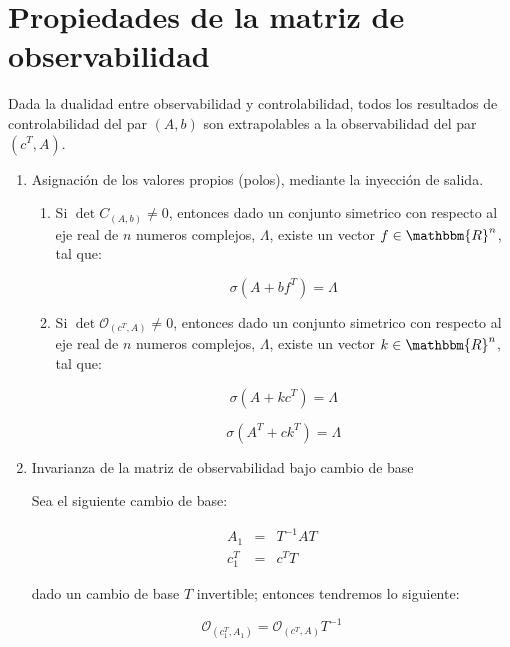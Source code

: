     \newpage
    \section{Propiedades de la matriz de observabilidad}

		Dada la dualidad entre observabilidad y controlabilidad, todos los resultados de controlabilidad del par $(A, b)$ son extrapolables a la observabilidad del par $(c^T, A)$.

		\begin{enumerate}
			\item Asignación de los valores propios (polos), mediante la inyección de salida.

			\begin{enumerate}
				\item Si $\det{C_{(A, b)}} \ne 0$, entonces dado un conjunto simetrico con respecto al eje real de $n$ numeros complejos, $\Lambda$, existe un vector $f \in \mathbbm{R}^n$, tal que:

				\begin{equation*}
					\sigma(A + b f^T) = \Lambda
				\end{equation*}

				\item Si $\det{\mathcal{O}_{(c^T, A)}} \ne 0$, entonces dado un conjunto simetrico con respecto al eje real de $n$ numeros complejos, $\Lambda$, existe un vector $k \in \mathbbm{R}^n$, tal que:

				\begin{equation*}
					\sigma(A + k c^T) = \Lambda
				\end{equation*}

				\begin{equation*}
					\sigma(A^T + c k^T) = \Lambda
				\end{equation*}
			\end{enumerate}

			\item Invarianza de la matriz de observabilidad bajo cambio de base

			Sea el siguiente cambio de base:

			\begin{eqnarray}
				A_1 & = & T^{-1} A T \\
				c_1^T & = & c^T T
			\end{eqnarray}

			dado un cambio de base $T$ invertible; entonces tendremos lo siguiente:

			\begin{equation}
				\mathcal{O}_{(c_1^T, A_1)} = \mathcal{O}_{(c^T, A)} T^{-1}
			\end{equation}


\end{enumerate}
